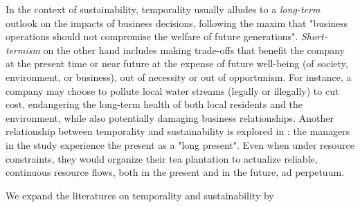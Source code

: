 In the context of sustainability, temporality usually alludes to a \textit{long-term} outlook on the impacts of business decisions, following the maxim that "business operations should not compromise the welfare of future generations"\citep[p. 531]{Slawinski2015}. \textit{Short-termism} on the other hand includes making trade-offs that benefit the company at the present time or near future at the expense of future well-being (of society, environment, or business), out of necessity or out of opportunism. For instance, a company may choose to pollute local water streams (legally or illegally) to cut cost, endangering the long-term health of both local residents and the environment, while also potentially damaging business relationships\citep{Slawinski2015}. Another relationship between temporality and sustainability is explored in \citet{Kim2019}: the managers in the study experience the present as a "long present". Even when under resource constraints, they would organize their tea plantation to actualize reliable, continuous resource flows, both in the present and in the future, ad perpetuum.

We expand the literatures on temporality and sustainability by





